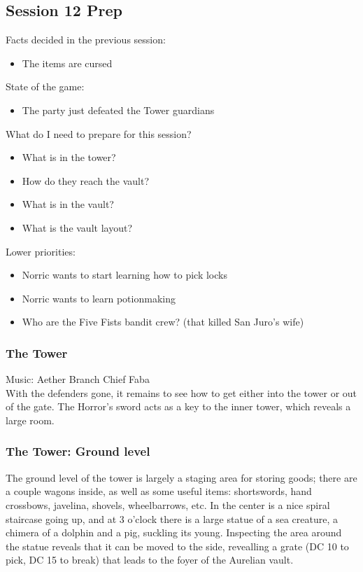 \subsection{Session 12 Prep}

Facts decided in the previous session:
\begin{itemize}
\item The items are cursed
\end{itemize}

State of the game:
\begin{itemize}
\item The party just defeated the Tower guardians
\end{itemize}

What do I need to prepare for this session?
\begin{itemize}
\item What is in the tower?
\item How do they reach the vault?
\item What is in the vault?
\item What is the vault layout?
\end{itemize}

Lower priorities:
\begin{itemize}
\item Norric wants to start learning how to pick locks
\item Norric wants to learn potionmaking
\item Who are the Five Fists bandit crew? (that killed San Juro's wife)
\end{itemize}



\subsubsection{The Tower}
Music: Aether Branch Chief Faba\\
With the defenders gone, it remains to see how to get either into the tower or out of the gate. The Horror's sword acts as a key to the inner tower, which reveals a large room.

\subsubsection{The Tower: Ground level}

The ground level of the tower is largely a staging area for storing goods; there are a couple wagons inside, as well as some useful items: shortswords, hand crossbows, javelina, shovels, wheelbarrows, etc. In the center is a nice spiral staircase going up, and at 3 o'clock there is a large statue of a sea creature, a chimera of a dolphin and a pig, suckling its young. Inspecting the area around the statue reveals that it can be moved to the side, revealling a grate (DC 10 to pick, DC 15 to break) that leads to the foyer of the Aurelian vault.

